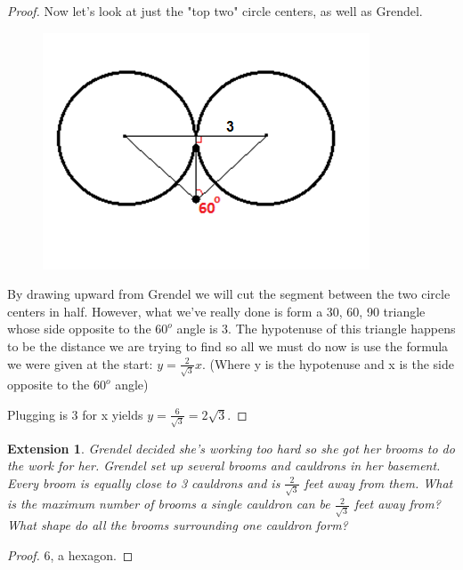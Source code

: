 \documentclass{article}
\newtheorem{extension}{Extension}
\begin{document}
\begin{proof}
Now let's look at just the "top two" circle centers, as well as Grendel.

\begin{figure}[h!]
\centering
\includegraphics[scale=.5]{circletri}
\end{figure}

By drawing upward from Grendel we will cut the segment between the two circle centers in half. However, what we've really done is form a 30, 60, 90 triangle whose side opposite to the $60^o$ angle is 3. The hypotenuse of this triangle happens to be the distance we are trying to find so all we must do now is use the formula we were given at the start: $y = \frac{2}{\sqrt{3}}x$. (Where y is the hypotenuse and x is the side opposite to the $60^o$ angle)

Plugging is 3 for x yields $y= \frac{6}{\sqrt{3}}=2\sqrt{3}$.
\end{proof}

\begin{extension}
Grendel decided she's working too hard so she got her brooms to do the work for her. Grendel set up several brooms and cauldrons in her basement. Every broom is equally close to 3 cauldrons and is $\frac{2}{\sqrt{3}}$ feet away from them. What is the maximum number of brooms a single cauldron can be $\frac{2}{\sqrt{3}}$ feet away from? What shape do all the brooms surrounding one cauldron form?
\end{extension}
\begin{proof}
6, a hexagon.
\end{proof}
\end{document}
